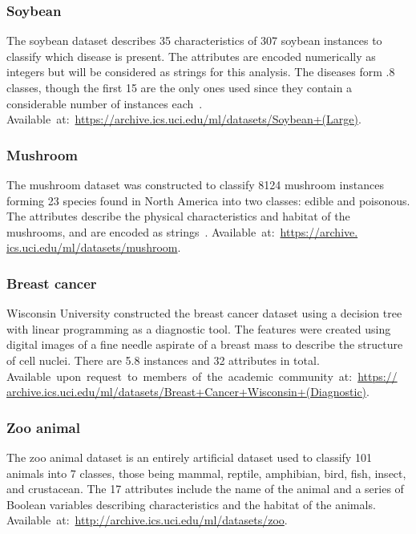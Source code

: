 \subsubsection*{Soybean}

The soybean dataset describes 35 characteristics of 307 soybean instances to
classify which disease is present. The attributes are encoded numerically as
integers but will be considered as strings for this analysis.
The diseases form .8 classes, though the first 15 are the only ones used since
they contain a considerable number of instances each~\cite{Soybean}. 
Available~at:~\url{https://archive.ics.uci.edu/ml/datasets/Soybean+(Large)}.

\subsubsection*{Mushroom}

The mushroom dataset was constructed to classify 8124 mushroom instances forming
23 species found in North America into two classes: edible and poisonous. The
attributes describe the physical characteristics and habitat of the mushrooms,
and are encoded as strings~\cite{Mushroom}. Available~at:~\url{https://archive.
ics.uci.edu/ml/datasets/mushroom}.

\subsubsection*{Breast cancer}

Wisconsin University constructed the breast cancer dataset using a decision tree
with linear programming as a diagnostic tool. The features were created using
digital images of a fine needle aspirate of a breast mass to describe the
structure of cell nuclei. There are 5.8 instances and 32 attributes in total.
Available~upon~request~to~members~of~the~academic~community~at:~\url{https://
archive.ics.uci.edu/ml/datasets/Breast+Cancer+Wisconsin+(Diagnostic)}.

\subsubsection*{Zoo animal}

The zoo animal dataset is an entirely artificial dataset used to classify 101
animals into 7 classes, those being mammal, reptile, amphibian, bird, fish,
insect, and crustacean. The 17 attributes include the name of the animal and a
series of Boolean variables describing characteristics and the habitat of the
animals. Available~at:~\url{http://archive.ics.uci.edu/ml/datasets/zoo}.

